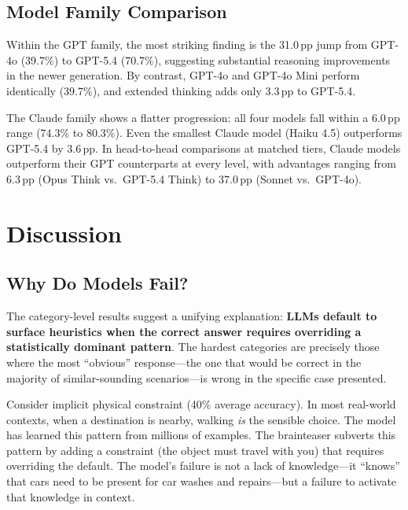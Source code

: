 \documentclass[11pt]{article}
\newcommand{\pp}{\,pp}
\begin{document}
\subsection{Model Family Comparison}

Within the GPT family, the most striking finding is the 31.0\pp{} jump from GPT-4o (39.7\%) to GPT-5.4 (70.7\%), suggesting substantial reasoning improvements in the newer generation. By contrast, GPT-4o and GPT-4o Mini perform identically (39.7\%), and extended thinking adds only 3.3\pp{} to GPT-5.4.

The Claude family shows a flatter progression: all four models fall within a 6.0\pp{} range (74.3\% to 80.3\%). Even the smallest Claude model (Haiku 4.5) outperforms GPT-5.4 by 3.6\pp{}. In head-to-head comparisons at matched tiers, Claude models outperform their GPT counterparts at every level, with advantages ranging from 6.3\pp{} (Opus Think vs.\ GPT-5.4 Think) to 37.0\pp{} (Sonnet vs.\ GPT-4o).

\section{Discussion}
\label{sec:discussion}

\subsection{Why Do Models Fail?}

The category-level results suggest a unifying explanation: \textbf{LLMs default to surface heuristics when the correct answer requires overriding a statistically dominant pattern}. The hardest categories are precisely those where the most ``obvious'' response---the one that would be correct in the majority of similar-sounding scenarios---is wrong in the specific case presented.

Consider implicit physical constraint (40\% average accuracy). In most real-world contexts, when a destination is nearby, walking \emph{is} the sensible choice. The model has learned this pattern from millions of examples. The brainteaser subverts this pattern by adding a constraint (the object must travel with you) that requires overriding the default. The model's failure is not a lack of knowledge---it ``knows'' that cars need to be present for car washes and repairs---but a failure to activate that knowledge in context.
\end{document}
